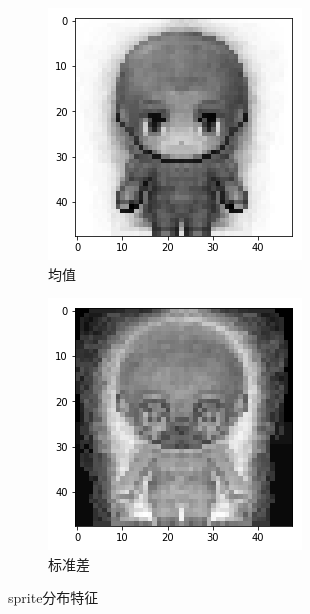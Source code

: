 \documentclass[twocolumn,11pt]{ctexart}
\begin{document}
\begin{figure}[htb]
    \centering
    \begin{subfigure}[b]{0.3\linewidth}
        \includegraphics[width=\linewidth]{mean_sprite.png}
        \caption{均值}
      \end{subfigure}
      \begin{subfigure}[b]{0.3\linewidth}
        \includegraphics[width=\linewidth]{sd_sprtie.png}
        \caption{标准差}
      \end{subfigure}
      \caption{sprite分布特征}
      \label{fig:meansd}
\end{figure}
\end{document}
